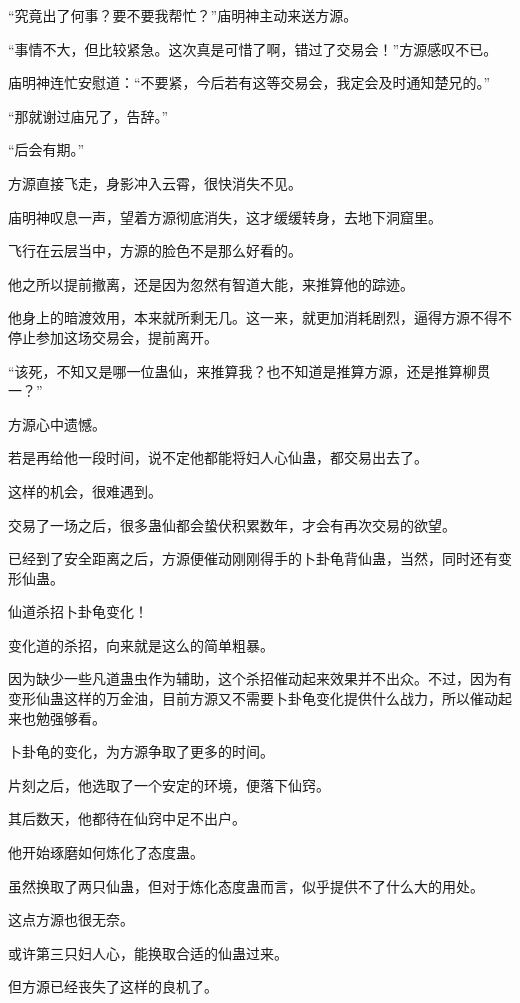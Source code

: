 \begin{this_body}
“究竟出了何事？要不要我帮忙？”庙明神主动来送方源。

“事情不大，但比较紧急。这次真是可惜了啊，错过了交易会！”方源感叹不已。

庙明神连忙安慰道：“不要紧，今后若有这等交易会，我定会及时通知楚兄的。”

“那就谢过庙兄了，告辞。”

“后会有期。”

方源直接飞走，身影冲入云霄，很快消失不见。

庙明神叹息一声，望着方源彻底消失，这才缓缓转身，去地下洞窟里。

飞行在云层当中，方源的脸色不是那么好看的。

他之所以提前撤离，还是因为忽然有智道大能，来推算他的踪迹。

他身上的暗渡效用，本来就所剩无几。这一来，就更加消耗剧烈，逼得方源不得不停止参加这场交易会，提前离开。

“该死，不知又是哪一位蛊仙，来推算我？也不知道是推算方源，还是推算柳贯一？”

方源心中遗憾。

若是再给他一段时间，说不定他都能将妇人心仙蛊，都交易出去了。

这样的机会，很难遇到。

交易了一场之后，很多蛊仙都会蛰伏积累数年，才会有再次交易的欲望。

已经到了安全距离之后，方源便催动刚刚得手的卜卦龟背仙蛊，当然，同时还有变形仙蛊。

仙道杀招卜卦龟变化！

变化道的杀招，向来就是这么的简单粗暴。

因为缺少一些凡道蛊虫作为辅助，这个杀招催动起来效果并不出众。不过，因为有变形仙蛊这样的万金油，目前方源又不需要卜卦龟变化提供什么战力，所以催动起来也勉强够看。

卜卦龟的变化，为方源争取了更多的时间。

片刻之后，他选取了一个安定的环境，便落下仙窍。

其后数天，他都待在仙窍中足不出户。

他开始琢磨如何炼化了态度蛊。

虽然换取了两只仙蛊，但对于炼化态度蛊而言，似乎提供不了什么大的用处。

这点方源也很无奈。

或许第三只妇人心，能换取合适的仙蛊过来。

但方源已经丧失了这样的良机了。


\end{this_body}
